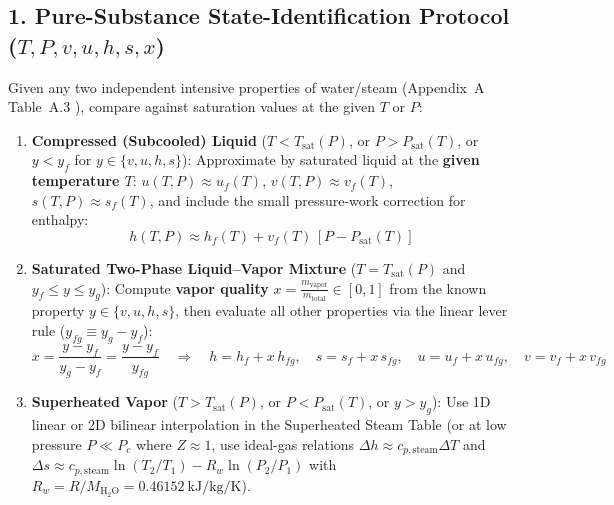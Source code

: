 \subsection{1. Pure-Substance State-Identification Protocol ($T, P, v, u, h, s, x$)}
Given any two independent intensive properties of water/steam (Appendix~A Table~A.3 ), compare against saturation values at the given $T$ or $P$:
\begin{enumerate}
  \item \textbf{Compressed (Subcooled) Liquid} ($T < T_{\mathrm{sat}}(P)$, or $P > P_{\mathrm{sat}}(T)$, or $y < y_f$ for $y \in \{v, u, h, s\}$): Approximate by saturated liquid at the \textbf{given temperature $T$}: $u(T,P) \approx u_f(T)$, $v(T,P) \approx v_f(T)$, $s(T,P) \approx s_f(T)$, and include the small pressure-work correction for enthalpy:
  \begin{equation}\label{eq:18:subcooled}
    h(T,P) \approx h_f(T) + v_f(T)\,\left[P - P_{\mathrm{sat}}(T)\right]
  \end{equation}
  \item \textbf{Saturated Two-Phase Liquid--Vapor Mixture} ($T = T_{\mathrm{sat}}(P)$ and $y_f \le y \le y_g$): Compute \textbf{vapor quality} $x = \frac{m_{\mathrm{vapor}}}{m_{\mathrm{total}}} \in [0, 1]$ from the known property $y \in \{v, u, h, s\}$, then evaluate all other properties via the linear lever rule ($y_{fg} \equiv y_g - y_f$):
  \begin{equation}\label{eq:18:quality}
    x = \frac{y - y_f}{y_g - y_f} = \frac{y - y_f}{y_{fg}} \quad\Longrightarrow\quad h = h_f + x\,h_{fg},\quad s = s_f + x\,s_{fg},\quad u = u_f + x\,u_{fg},\quad v = v_f + x\,v_{fg}
  \end{equation}
  \item \textbf{Superheated Vapor} ($T > T_{\mathrm{sat}}(P)$, or $P < P_{\mathrm{sat}}(T)$, or $y > y_g$): Use 1D linear or 2D bilinear interpolation in the Superheated Steam Table (or at low pressure $P \ll P_c$ where $Z \approx 1$, use ideal-gas relations $\Delta h \approx c_{p,\mathrm{steam}}\Delta T$ and $\Delta s \approx c_{p,\mathrm{steam}}\ln(T_2/T_1) - R_w\ln(P_2/P_1)$ with $R_w = R/M_{\mathrm{H_2O}} = \SI{0.46152}{\kilo\joule\per\kilogram\per\kelvin}$).
\end{enumerate}

